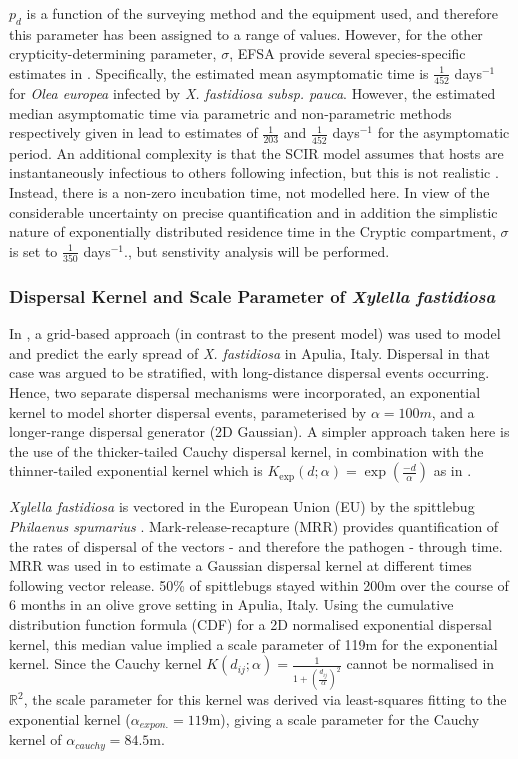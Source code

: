 \documentclass[prstpaper]{revtex4-2}
\begin{document}
$p_{d}$ is a function of the surveying method and the equipment used, and therefore this parameter has been assigned to a range of values. However, for the other crypticity-determining parameter, $\sigma$, EFSA provide several species-specific estimates in \cite{Bragard2019}. Specifically, the estimated mean asymptomatic time is $\frac{1}{452}$ days$^{-1}$ for \emph{Olea europea} infected by \emph{X. fastidiosa subsp. pauca}. However, the estimated median asymptomatic time via parametric and non-parametric methods respectively given in \cite{Bragard2019} lead to estimates of $\frac{1}{203}$ and $\frac{1}{452}$ days$^{-1}$ for the asymptomatic period. An additional complexity is that the SCIR model assumes that hosts are instantaneously infectious to others following infection, but this is not realistic \cite{Leclerc2014}. Instead, there is a non-zero incubation time, not modelled here. In view of the considerable uncertainty on precise quantification and in addition the simplistic nature of exponentially distributed residence time in the Cryptic compartment, $\sigma$ is set to $\frac{1}{350}$  days$^{-1}$., but senstivity analysis will be performed.

\subsubsection{Dispersal Kernel and Scale Parameter of \emph{Xylella fastidiosa}}

In \cite{White2017}, a grid-based approach (in contrast to the present model) was used to model and predict the early spread of \emph{X. fastidiosa} in Apulia, Italy. Dispersal in that case was argued to be stratified, with long-distance dispersal events occurring. Hence, two separate dispersal mechanisms were incorporated, an exponential kernel to model shorter dispersal events, parameterised by $\alpha = 100 m$, and a longer-range dispersal generator (2D Gaussian). A simpler approach taken here is the use of the thicker-tailed Cauchy dispersal kernel, in combination with the thinner-tailed exponential kernel which is $K_{\exp}(d; \alpha) = \exp\left(\frac{-d}{\alpha}\right)$ as in \cite{HyattTwynham2017}. 

\emph{Xylella fastidiosa} is vectored in the European Union (EU) by the spittlebug \emph{Philaenus spumarius} \cite{Bragard2019}\cite{Bodino2021}. Mark-release-recapture (MRR) provides quantification of the rates of dispersal of the vectors - and therefore the pathogen - through time. MRR was used in \cite{Bodino2021} to estimate a Gaussian dispersal kernel at different times following vector release. 50\% of spittlebugs stayed within 200m over the course of 6 months in an olive grove setting in Apulia, Italy. Using the cumulative distribution function formula (CDF) for a 2D normalised exponential dispersal kernel, this median value implied a scale parameter of 119m for the exponential kernel.
Since the Cauchy kernel $K(d_{ij}; \alpha) = \frac{1}{1+\left(\frac{d_{ij}} {\alpha}\right)^2}$ cannot be normalised in $\mathbb{R}^2$, the scale parameter for this kernel was derived via least-squares fitting to the exponential kernel ($\alpha_{expon.}=119$m), giving a scale parameter for the Cauchy kernel of $\alpha_{cauchy}= 84.5$m.
\end{document}
